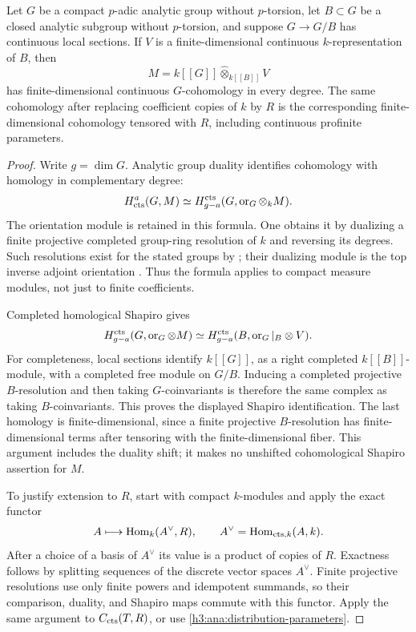 \begin{lemma}\label{h3:ana:measure-induction}
Let $G$ be a compact $p$-adic analytic group without
$p$-torsion, let $B\subset G$ be a closed analytic subgroup
without $p$-torsion, and suppose $G\to G/B$ has continuous
local sections.  If $V$ is a finite-dimensional continuous
$k$-representation of $B$, then
\[
 M=k[[G]]\widehat\otimes_{k[[B]]}V
\]
has finite-dimensional continuous $G$-cohomology in every
degree.  The same cohomology after replacing coefficient
copies of $k$ by $R$ is the corresponding finite-dimensional
cohomology tensored with $R$, including continuous
profinite parameters.
\end{lemma}
\begin{proof}
Write $g=\dim G$.  Analytic group duality identifies
cohomology with homology in complementary degree:
\[
 H^a_{\mathrm{cts}}(G,M)
   \simeq H^{\mathrm{cts}}_{g-a}
        (G,\operatorname{or}_G\otimes_k M).
\]
The orientation module is retained in this formula.
One obtains it by dualizing a finite projective completed
group-ring resolution of $k$ and reversing its degrees.
Such resolutions exist for the stated groups by
\cite[Proposition~3.3]{AW}; their dualizing module is the top inverse
adjoint orientation
\cite[Proposition~4.16, Remark~4.23, and Proposition~4.40]{BGHS}.
Thus the formula applies to compact
measure modules, not just to finite coefficients.

Completed homological Shapiro gives
\[
 H^{\mathrm{cts}}_{g-a}(G,\operatorname{or}_G\otimes M)
   \simeq H^{\mathrm{cts}}_{g-a}
       (B,\operatorname{or}_G|_B\otimes V).
\]
For completeness, local sections identify $k[[G]]$, as a
right completed $k[[B]]$-module, with a completed free
module on $G/B$.  Inducing a completed projective
$B$-resolution and then taking $G$-coinvariants is
therefore the same complex as taking $B$-coinvariants.
This proves the displayed Shapiro identification.
The last homology is finite-dimensional, since a finite
projective $B$-resolution has finite-dimensional terms
after tensoring with the finite-dimensional fiber.
This argument includes the duality shift; it makes no
unshifted cohomological Shapiro assertion for $M$.

To justify extension to $R$, start with compact $k$-modules
and apply the exact functor
\[
 A\longmapsto\operatorname{Hom}_k(A^\vee,R),\qquad
 A^\vee=\operatorname{Hom}_{\mathrm{cts},k}(A,k).
\]
After a choice of a basis of $A^\vee$ its value is a
product of copies of $R$.  Exactness follows by splitting
sequences of the discrete vector spaces $A^\vee$.
Finite projective resolutions use only finite powers
and idempotent summands, so their comparison, duality,
and Shapiro maps commute with this functor.  Apply the
same argument to $C_{\mathrm{cts}}(T,R)$, or use
\eqref{h3:ana:distribution-parameters}.
\end{proof}


